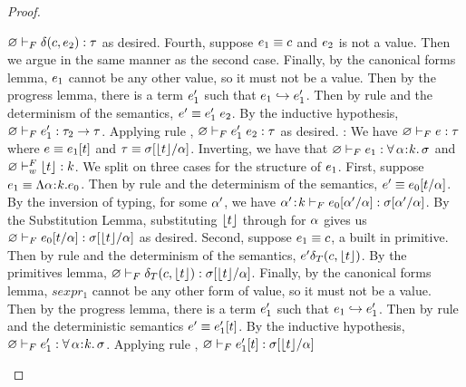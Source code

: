 \begin{proof}
\begin{itemize}
    ${\varnothing} \vdash_F {\delta(c,e_2)} : {\tau}$ as desired.
    Fourth, suppose $e_1 \equiv c$ and $e_2$
    is not a value. Then we argue in the same manner as the second case.
    Finally, by the canonical forms lemma, $e_1$ cannot be any other
    value, so it must not be a value. Then by the progress lemma,
    there is a term $e'_1$ such that $e_1 \hookrightarrow e'_1$. 
    Then by rule \eApp and the determinism of the semantics,
    $e' \equiv \app{\sexpr'_1}{\sexpr_2}$. By the inductive hypothesis,
    ${\varnothing} \vdash_F {e'_1} : {\tau_2 \rightarrow \tau}$.
    Applying rule \fApp, ${\varnothing} \vdash_F {{e'_1}\;{e_2}} : {\tau}$
    as desired.
    \pfcase{\fTApp}: We have 
    ${\varnothing} \vdash_F {e} : {\tau}$ where
    $e \equiv e_1[t]$ and
    $\tau \equiv {\sigma}[\lfloor{\ensuremath{t}}\rfloor/\alpha]$. 
    Inverting, we have that 
    ${\varnothing} \vdash_F {e_1} : {\forall\, \alpha\hspace{0.05em}{:}\hspace{0.05em} k.\, \sigma}$
    and ${\varnothing} \vdash_w^F {\lfloor{\ensuremath{t}}\rfloor} : {k}$.
    We split on three cases for the structure of $e_1$.
    First, suppose $e_1 \equiv \Lambda{\ensuremath{\alpha}}\hspace{0.05em}{:}\hspace{0.05em}{\ensuremath{k}}.{e_0}$.
    Then by rule \eTAppAbs and the determinism of the semantics, 
    $\sexpr' \equiv \subst{\sexpr_0}{\tvar}{\stype}$.
    By the inversion of typing, for some $\alpha'$, we have
    ${{{\alpha'}\!:\!{k}}} \vdash_F {{e_0}[\alpha'/\alpha]} : {{\sigma}[\alpha'/\alpha]}$.
    By the Substitution Lemma, substituting $\lfloor{\ensuremath{t}}\rfloor$ 
    through for $\alpha$  gives us 
    ${\varnothing} \vdash_F {{e_0}[t/\alpha]} : {{\sigma}[\lfloor{\ensuremath{t}}\rfloor/\alpha]}$ as desired.
    Second, suppose $e_1 \equiv c$, a built in primitive.
    Then by rule \eTPrim and the determinism of the semantics, 
    $e' \delta_T(c,\lfloor{\ensuremath{t}}\rfloor)$. By the primitives lemma,
    ${\varnothing} \vdash_F {\delta_T(c,\lfloor{\ensuremath{t}}\rfloor)} : {{\sigma}[\lfloor{\ensuremath{t}}\rfloor/\alpha]}$.
    Finally, by the canonical forms lemma, $sexpr_1$ cannot be any other
    form of value, so it must not be a value. Then by the progress lemma,
    there is a term $e'_1$ such that $e_1 \hookrightarrow e'_1$. 
    Then by rule \eTApp and the deterministic semantics
    $e' \equiv e'_1[t]$.  By the inductive hypothesis,
    ${\varnothing} \vdash_F {e'_1} : {\forall\, \alpha\hspace{0.05em}{:}\hspace{0.05em} k.\, \sigma}$.
    Applying rule \fTApp, 
    ${\varnothing} \vdash_F {e'_1[t]} : {{\sigma}[\lfloor{\ensuremath{t}}\rfloor/\alpha]}$

\end{itemize}
\end{proof}

